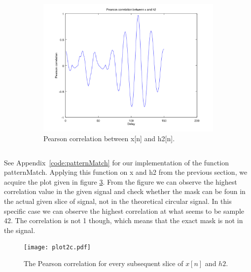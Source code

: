\documentclass{article}
\begin{document}
\begin{figure}[H]
\begin{subfigure}{.49\textwidth}
    \includegraphics[width=\textwidth]{plot2b5.png}
    \caption{Pearson correlation between x[n] and h2[n].}
    \label{fig:2b5}
  \end{subfigure}
  \caption{}
  \label{fig:2b}
\end{figure}

\subsection{}
See Appendix~\ref{code:patternMatch} for our implementation of the function patternMatch.
Applying this function on x and h2 from the previous section, we acquire the plot
given in figure \ref{fig:2c}. From the figure we can observe the highest correlation value
in the given signal and check whether the mask can be foun in the actual given slice of signal,
not in the theoretical circular signal. In this specific case we can observe the highest
correlation at what seems to be sample 42. The correlation is not 1 though, which means
that the exact mask is not in the signal.
\begin{figure}[H]
  \centering
  \texttt{[image: plot2c.pdf]}
  \caption{The Pearson correlation for every subsequent slice of $x[n]$ and $h2$.}
  \label{fig:2c}
\end{figure}
\end{document}
